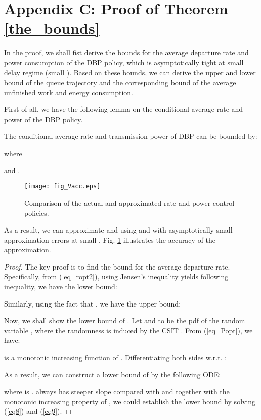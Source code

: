 \documentclass[11pt,journal, onecolumn]{./IEEEtran}
\newcommand{\red}{\color{black}}
\begin{document}
\section*{Appendix C: Proof of Theorem \ref{the_bounds}}\label{app_bounds}
{\red In the proof, we shall fist derive the bounds for the average departure rate and power consumption of the DBP policy, which is asymptotically tight at small delay regime (small ). Based on these bounds, we can derive the upper and lower bound of the queue trajectory and the corresponding bound of the average unfinished work and energy consumption.

First of all, we have the following lemma on the conditional average rate and power of the DBP policy.}
\begin{Lemma}\label{lem_approx}
The conditional average rate and transmission power of DBP can be bounded by:


where 

and . ~\hfill\IEEEQED
\end{Lemma}
\begin{figure}[t!]
\centering
\texttt{[image: fig\_Vacc.eps]}
\caption{Comparison of the actual and approximated rate and power control policies.} \label{fig_Vacc}
\end{figure}

As a result, we can approximate  and  using  and  with asymptotically small approximation errors at small . Fig. \ref{fig_Vacc} illustrates the accuracy of the approximation.
\begin{proof} {\red The key proof is to find the bound for the average departure rate. Specifically,
from (\ref{eq_ropt2}), using Jensen's inequality yields following inequality, we have the lower bound:}

Similarly, using the fact that , {\red we have the upper bound}:


{\red Now, we shall show the lower bound of .} Let  and  to be the pdf of the random variable , where the randomness is induced by the CSIT . From (\ref{eq_Popt}), we have:


 is a monotonic increasing function of . Differentiating both sides w.r.t. :

As a result, we can construct a lower bound of  by the following ODE:


where  is .  always has steeper slope compared with  and together with the monotonic increasing property of , we could establish the lower bound by solving (\ref{eq8}) and (\ref{eq9}).
\end{proof}
\end{document}
